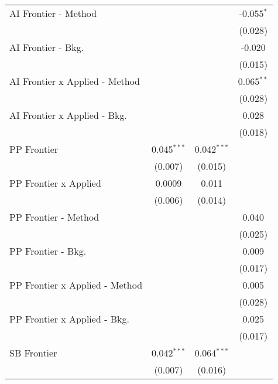 \begin{tabular}{lccc}
   AI Frontier - Method           &               &               & -0.055$^{*}$\\   
                                  &               &               & (0.028)\\   
   AI Frontier - Bkg.             &               &               & -0.020\\   
                                  &               &               & (0.015)\\   
   AI Frontier x Applied - Method &               &               & 0.065$^{**}$\\   
                                  &               &               & (0.028)\\   
   AI Frontier x Applied - Bkg.   &               &               & 0.028\\   
                                  &               &               & (0.018)\\   
   PP Frontier                    & 0.045$^{***}$ & 0.042$^{***}$ &   \\   
                                  & (0.007)       & (0.015)       &   \\   
   PP Frontier x Applied          & 0.0009        & 0.011         &   \\   
                                  & (0.006)       & (0.014)       &   \\   
   PP Frontier - Method           &               &               & 0.040\\   
                                  &               &               & (0.025)\\   
   PP Frontier - Bkg.             &               &               & 0.009\\   
                                  &               &               & (0.017)\\   
   PP Frontier x Applied - Method &               &               & 0.005\\   
                                  &               &               & (0.028)\\   
   PP Frontier x Applied - Bkg.   &               &               & 0.025\\   
                                  &               &               & (0.017)\\   
   SB Frontier                    & 0.042$^{***}$ & 0.064$^{***}$ &   \\   
                                  & (0.007)       & (0.016)       &   \\   

\end{tabular}
